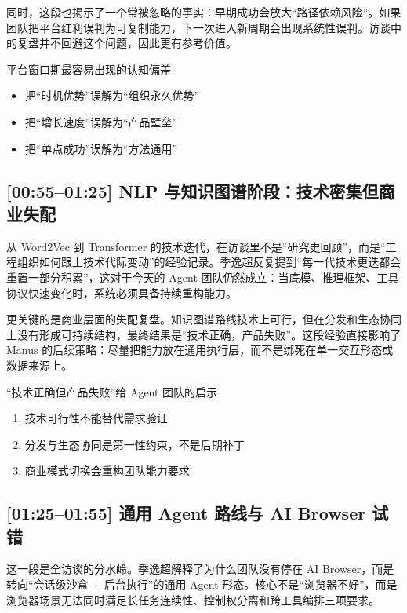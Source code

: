 \documentclass[a4paper]{article}
\begin{document}
同时，这段也揭示了一个常被忽略的事实：早期成功会放大“路径依赖风险”。如果团队把平台红利误判为可复制能力，下一次进入新周期会出现系统性误判。访谈中的复盘并不回避这个问题，因此更有参考价值。

\begin{warningbox}{平台窗口期最容易出现的认知偏差}
\begin{itemize}
    \item 把“时机优势”误解为“组织永久优势”
    \item 把“增长速度”误解为“产品壁垒”
    \item 把“单点成功”误解为“方法通用”
\end{itemize}
\end{warningbox}

\subsection{[00:55--01:25] NLP 与知识图谱阶段：技术密集但商业失配}

从 Word2Vec 到 Transformer 的技术迭代，在访谈里不是“研究史回顾”，而是“工程组织如何跟上技术代际变动”的经验记录。季逸超反复提到“每一代技术更迭都会重置一部分积累”，这对于今天的 Agent 团队仍然成立：当底模、推理框架、工具协议快速变化时，系统必须具备持续重构能力。

更关键的是商业层面的失配复盘。知识图谱路线技术上可行，但在分发和生态协同上没有形成可持续结构，最终结果是“技术正确，产品失败”。这段经验直接影响了 Manus 的后续策略：尽量把能力放在通用执行层，而不是绑死在单一交互形态或数据来源上。

\begin{importantbox}{“技术正确但产品失败”给 Agent 团队的启示}
\begin{enumerate}
    \item 技术可行性不能替代需求验证
    \item 分发与生态协同是第一性约束，不是后期补丁
    \item 商业模式切换会重构团队能力要求
\end{enumerate}
\end{importantbox}

\subsection{[01:25--01:55] 通用 Agent 路线与 AI Browser 试错}

这一段是全访谈的分水岭。季逸超解释了为什么团队没有停在 AI Browser，而是转向“会话级沙盒 + 后台执行”的通用 Agent 形态。核心不是“浏览器不好”，而是浏览器场景无法同时满足长任务连续性、控制权分离和跨工具编排三项要求。
\end{document}

